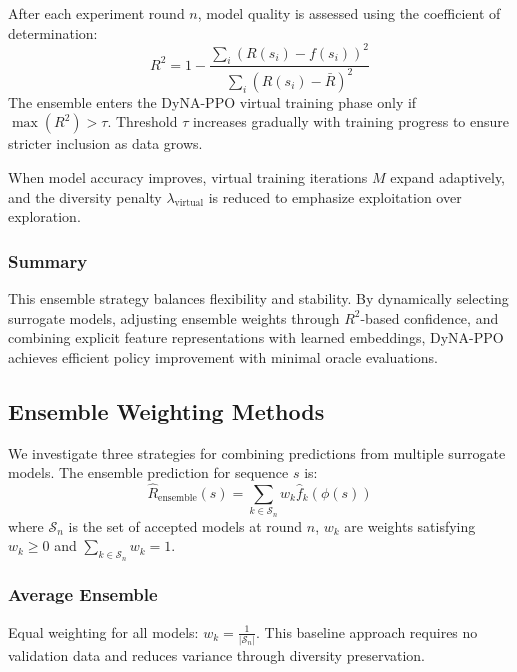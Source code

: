 \documentclass[conference]{IEEEtran}
\begin{document}
After each experiment round $n$, model quality is assessed using the coefficient of determination:
\begin{equation}
R^2 = 1 - \frac{\sum_i (R(s_i) - f(s_i))^2}{\sum_i (R(s_i) - \bar{R})^2}
\end{equation}
The ensemble enters the DyNA-PPO virtual training phase only if $\max(R^2) > \tau$. Threshold $\tau$ increases gradually with training progress to ensure stricter inclusion as data grows.

When model accuracy improves, virtual training iterations $M$ expand adaptively, and the diversity penalty $\lambda_{\text{virtual}}$ is reduced to emphasize exploitation over exploration.

\subsubsection{Summary}

This ensemble strategy balances flexibility and stability. By dynamically selecting surrogate models, adjusting ensemble weights through $R^2$-based confidence, and combining explicit feature representations with learned embeddings, DyNA-PPO achieves efficient policy improvement with minimal oracle evaluations.









\subsection{Ensemble Weighting Methods}

We investigate three strategies for combining predictions from multiple surrogate models. The ensemble prediction for sequence $s$ is:
\begin{equation}
\hat{R}_{\text{ensemble}}(s) = \sum_{k \in \mathcal{S}_n} w_k \hat{f}_k(\phi(s))
\end{equation}
where $\mathcal{S}_n$ is the set of accepted models at round $n$, $w_k$ are weights satisfying $w_k \geq 0$ and $\sum_{k \in \mathcal{S}_n} w_k = 1$.

\subsubsection{Average Ensemble}

Equal weighting for all models: $w_k = \frac{1}{|\mathcal{S}_n|}$. This baseline approach requires no validation data and reduces variance through diversity preservation.
\end{document}
